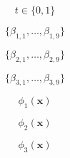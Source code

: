 \documentclass[10pt,twoside]{book}
\newcommand{\fat}[1]{\mathbf{#1}} %
\begin{document}
$$
t \in \{ 0, 1 \}
$$


$$
\{ \beta_{1,1}, \ldots, \beta_{1,9} \}
$$

$$
\{ \beta_{2,1}, \ldots, \beta_{2,9} \}
$$

$$
\{ \beta_{3,1}, \ldots, \beta_{3,9} \}
$$

$$
\phi_1( \fat{x} ) 
$$

$$
\phi_2( \fat{x} ) 
$$

$$
\phi_3( \fat{x} ) 
$$
\end{document}

